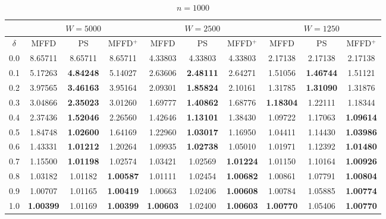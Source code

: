 \documentclass[oribibl]{llncs}
\begin{document}
\begin{table}[!htb]
	\centering
	\caption{$n = 1000$}
	\begin{tabular}{c@{\hspace{15pt}}c@{\hspace{10pt}}c@{\hspace{10pt}}c@{\hspace{7pt}}| @{\hspace{7pt}}c@{\hspace{10pt}}c@{\hspace{10pt}}c@{\hspace{7pt}}| @{\hspace{7pt}} c@{\hspace{10pt}}c@{\hspace{10pt}}c}
		\noalign{\smallskip}
		& \multicolumn{3}{c}{$W = 5000$} & \multicolumn{3}{c}{$W = 2500$} & \multicolumn{3}{c}{$W = 1250$} \\
		\hline\noalign{\smallskip}
		$\delta$ & MFFD & PS & MFFD$^+$ & MFFD & PS & MFFD$^+$ & MFFD & PS & MFFD$^+$ \\
		\noalign{\smallskip}
		\hline
		\noalign{\smallskip}
		0.0 & 8.65711 & 8.65711 & 8.65711 & 4.33803 & 4.33803 & 4.33803 & 2.17138 & 2.17138 & 2.17138 \\
		0.1 & 5.17263 & \textbf{4.84248} & 5.14027 & 2.63606 & \textbf{2.48111} & 2.64271 & 1.51056 & \textbf{1.46744} & 1.51121 \\
		0.2 & 3.97565 & \textbf{3.46163} & 3.95164 & 2.09301 & \textbf{1.85824} & 2.10161 & 1.31785 & \textbf{1.31090} & 1.31876 \\
		0.3 & 3.04866 & \textbf{2.35023} & 3.01260 & 1.69777 & \textbf{1.40862} & 1.68776 & \textbf{1.18304} & 1.22111 & 1.18344 \\
		0.4 & 2.37436 & \textbf{1.52046} & 2.26560 & 1.42646 & \textbf{1.13101} & 1.38430 & 1.09722 & 1.17063 & \textbf{1.09614} \\
		0.5 & 1.84748 & \textbf{1.02600} & 1.64169 & 1.22960 & \textbf{1.03017} & 1.16950 & 1.04411 & 1.14430 & \textbf{1.03986} \\
		0.6 & 1.43331 & \textbf{1.01212} & 1.20264 & 1.09935 & \textbf{1.02738} & 1.05010 & 1.01971 & 1.12392 & \textbf{1.01480} \\
		0.7 & 1.15500 & \textbf{1.01198} & 1.02574 & 1.03421 & 1.02569 & \textbf{1.01224} & 1.01150 & 1.10164 & \textbf{1.00926} \\
		0.8 & 1.03182 & 1.01182 & \textbf{1.00587} & 1.01111 & 1.02454 & \textbf{1.00682} & 1.00861 & 1.07791 & \textbf{1.00804} \\
		0.9 & 1.00707 & 1.01165 & \textbf{1.00419} & 1.00663 & 1.02406 & \textbf{1.00608} & 1.00784 & 1.05885 & \textbf{1.00774} \\
		1.0 & \textbf{1.00399} & 1.01169 & \textbf{1.00399} & \textbf{1.00603} & 1.02400 & \textbf{1.00603} & \textbf{1.00770} & 1.05406 & \textbf{1.00770} \\
		\hline
	\end{tabular}
	\label{table:n1000}
\end{table}	
\end{document}
